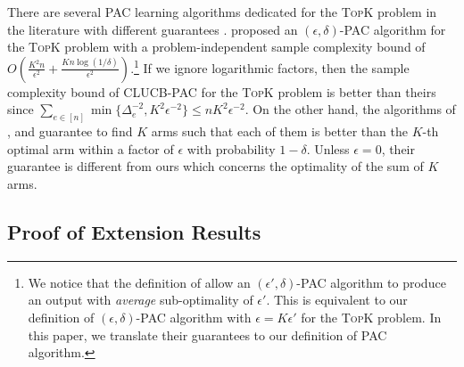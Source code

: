 \documentclass{article}
\newcommand{\AlgorithmPAC}{{\small \textsf{CLUCB-PAC}}\xspace}
\newcommand{\MultiIdent}{\textsc{TopK}\xspace}
\begin{document}
There are several PAC learning algorithms dedicated for the \MultiIdent problem in the literature with different guarantees \citep{kalyanakrishnan2012pac,zhou2014optimal,gabillon2012best}.
\citet{zhou2014optimal} proposed an $(\epsilon,\delta)$-PAC algorithm for the \MultiIdent problem with a problem-independent sample complexity bound of $O(\frac{K^2n}{\epsilon^2}+\frac{Kn\log(1/\delta)}{\epsilon^2})$.\footnote{We notice that the definition of \citet{zhou2014optimal} allow an $(\epsilon',\delta)$-PAC algorithm to produce an output with \emph{average} sub-optimality of $\epsilon'$. This is equivalent to our definition of $(\epsilon,\delta)$-PAC algorithm with $\epsilon=K\epsilon'$ for the \MultiIdent problem.
In this paper, we translate their guarantees to our definition of PAC algorithm.}
If we ignore logarithmic factors, then the sample complexity bound of \AlgorithmPAC for the \MultiIdent problem is better than theirs since $\sum_{e\in[n]}\min\{\Delta_e^{-2}, K^2\epsilon^{-2}\}  \le  nK^2\epsilon^{-2} $.
On the other hand, the algorithms of \citet{kalyanakrishnan2012pac}, \citet{gabillon2012best} and \citet{kaufmann2013information} guarantee to find $K$ arms such that each of them is better than the $K$-th optimal arm within a factor of $\epsilon$ with probability $1-\delta$.
Unless $\epsilon=0$, their guarantee is different from ours which concerns the optimality of the sum of $K$ arms.





\subsection{Proof of Extension Results}
\end{document}
